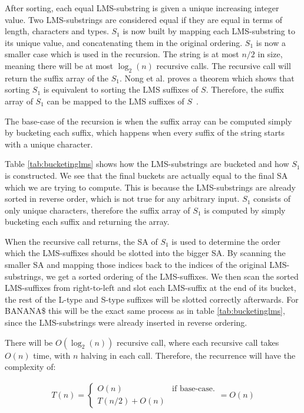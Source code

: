 After sorting, each equal LMS-substring is given a unique increasing integer value. Two
LMS-substrings are considered equal if they are equal in terms of length, characters and
types. $S_1$ is now built by mapping each LMS-substring to its unique value, and
concatenating them in the original ordering. $S_1$ is now a smaller case which is used in
the recursion. The string is at most $n / 2$ in size, meaning there will be at most
$\log_2(n)$ recursive calls. The recursive call will return the suffix array of the $S_1$.
Nong et al. proves a theorem which shows that sorting $S_1$ is
equivalent to sorting the LMS suffixes of $S$. Therefore, the suffix array of $S_1$ can be
mapped to the LMS suffixes of $S$~\cite{LinearTimeSuffixArraySAIS}.

The base-case of the recursion is when the suffix array can be computed simply by
bucketing each suffix, which happens when every suffix of the string starts with a unique
character. 

Table \ref{tab:bucketinglms} shows how the LMS-substrings are bucketed and how $S_1$ is
constructed. We see that the final buckets are actually equal to the final SA which we are
trying to compute. This is because the LMS-substrings are already sorted in reverse order,
which is not true for any arbitrary input. $S_1$ consists of only unique characters,
therefore the suffix array of $S_1$ is computed by simply bucketing each suffix and
returning the array.

When the recursive call returns, the SA of $S_1$ is used to determine the order which the
LMS-suffixes should be slotted into the bigger SA. By scanning the smaller SA and mapping
those indices back to the indices of the original LMS-substrings, we get a sorted ordering
of the LMS-suffixes. We then scan the sorted LMS-suffixes from right-to-left and slot each
LMS-suffix at the end of its bucket, the rest of the L-type and S-type suffixes will be
slotted correctly afterwards. For BANANA\$ this will be the exact same process as in table
\ref{tab:bucketinglms}, since the LMS-substrings were already inserted in reverse
ordering.

There will be $O(\log_2(n))$ recursive call, where each recursive call takes $O(n)$ time,
with $n$ halving in each call. Therefore, the recurrence will have the complexity of:

\begin{gather*}
    T(n) =
\begin{cases}
    O(n) & \text{if base-case.} \\
    T(n / 2) + O(n)
\end{cases}
= O(n)
\end{gather*}

